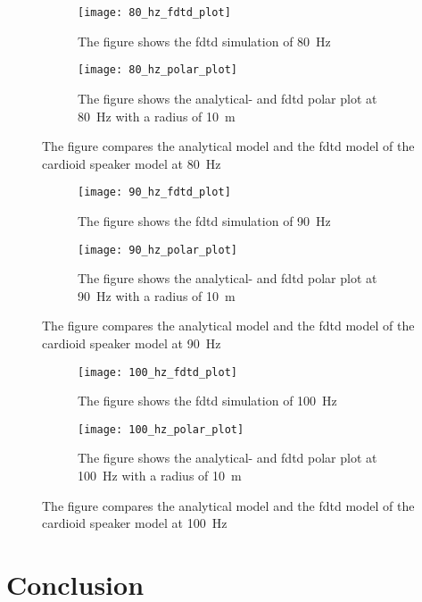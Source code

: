 \begin{figure}[H]
\centering
\begin{subfigure}[htbp]{0.55\textwidth}
		\texttt{[image: 80\_hz\_fdtd\_plot]}
		\caption{The figure shows the \gls{fdtd} simulation of \SI{80}{\hertz}}
		\label{fig:fdtd_80_Hz}
\end{subfigure}
\begin{subfigure}[htbp]{0.35\textwidth}
		\texttt{[image: 80\_hz\_polar\_plot]}
		\caption{The figure shows the analytical- and \gls{fdtd} polar plot at \SI{80}{\hertz} with a radius of \SI{10}{\meter}}
		\label{fig:polar_80_Hz}
\end{subfigure} 
\caption{The figure compares the analytical model and the \gls{fdtd} model of the cardioid speaker model at \SI{80}{\hertz}}
\end{figure}


\begin{figure}[H]
\centering
\begin{subfigure}[htbp]{0.55\textwidth}
		\texttt{[image: 90\_hz\_fdtd\_plot]}
		\caption{The figure shows the \gls{fdtd} simulation of \SI{90}{\hertz}}
		\label{fig:fdtd_90_Hz}
\end{subfigure}
\begin{subfigure}[htbp]{0.35\textwidth}
		\texttt{[image: 90\_hz\_polar\_plot]}
		\caption{The figure shows the analytical- and \gls{fdtd} polar plot at \SI{90}{\hertz} with a radius of \SI{10}{\meter}}
		\label{fig:polar_90_Hz}
\end{subfigure} 
\caption{The figure compares the analytical model and the \gls{fdtd} model of the cardioid speaker model at \SI{90}{\hertz}}
\end{figure}


\begin{figure}[H]
\centering
\begin{subfigure}[htbp]{0.55\textwidth}
		\texttt{[image: 100\_hz\_fdtd\_plot]}
		\caption{The figure shows the \gls{fdtd} simulation of \SI{100}{\hertz}}
		\label{fig:fdtd_100_Hz}
\end{subfigure}
\begin{subfigure}[htbp]{0.35\textwidth}
		\texttt{[image: 100\_hz\_polar\_plot]}
		\caption{The figure shows the analytical- and \gls{fdtd} polar plot at \SI{100}{\hertz} with a radius of \SI{10}{\meter}}
		\label{fig:polar_100_Hz}
\end{subfigure} 
\caption{The figure compares the analytical model and the \gls{fdtd} model of the cardioid speaker model at \SI{100}{\hertz}}
\end{figure}

\section{Conclusion}